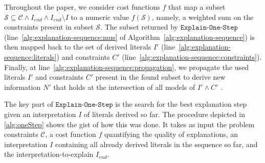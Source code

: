 \documentclass[twoside,11pt]{article}
\newcommand\m[1]{\mathcal{#1}}
\newcommand\comment[1]{\marginpar{\tiny #1}}
\renewcommand\comment[1]{#1}
\newcommand{\tias}[1]{{\comment{\color{blue}Tias:#1}}}
\newcommand{\emilio}[1]{{\comment{\color{red}Emilio: #1}}}
\newcommand{\bart}[1]{{\comment{\color{OliveGreen}Bart: #1}}}
\newcommand\Iend{\ensuremath{I_\mathit{end} }\xspace}
\newcommand\formulac{\ensuremath{\m{C} }\xspace}
\newcommand\mm[1]{\ensuremath{#1}\xspace}
\newcommand\call[1]{\mm{\texttt{#1}}}
\newcommand\onestep{\ensuremath{\call{Explain-One-Step}}\xspace}
\begin{document}


Throughout the paper, we consider cost functions $f$ that map a subset $\m{S} \subseteq \formulac \wedge \Iend \wedge \overline{\Iend \setminus I}$ to a numeric value $f(\m{S})$, namely, a weighted sum on the constraints present in subset $\m{S}$.
The subset returned by \onestep (line~\ref{alg:explanation-sequence:mus} of Algorithm~\ref{alg:explanation-sequence}) is then mapped back to the set of derived literals $I'$ (line~\ref{alg:explanation-sequence:literals}) and constraints $C'$ (line~\ref{alg:explanation-sequence:constraints}). 
Finally, at line~\ref{alg:explanation-sequence:propagation}, we propagate the used literals $I'$ and constraints $C'$ present in the found subset to derive new information $N'$ that holds at the intersection of all models of $I' \wedge C'$ . 

The key part of \onestep is the search for the best explanation step given an interpretation $I$ of literals derived so far.
The procedure depicted in \cref{alg:oneStep} shows the gist of how this was done. 
It takes as input the problem constraints \formulac, a cost function $f$ quantifying the quality of explanations, an interpretation $I$ containing all already derived literals in the sequence so far, and the interpretation-to-explain $\Iend$. 


\end{document}
